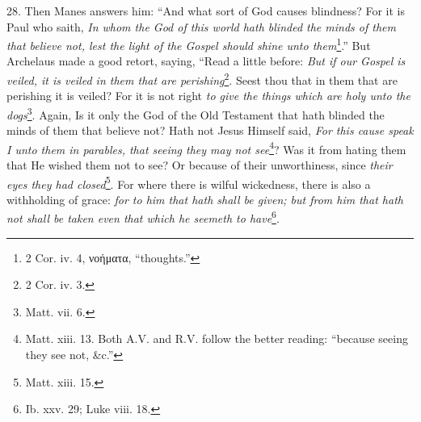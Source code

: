 28. Then Manes answers him: “And what sort of God causes blindness? For it is Paul who saith, \emph{In whom the God of this world hath blinded the minds of them that believe not, lest the light of the Gospel should shine unto them}\footnote{2 Cor. iv. 4, \textgreek{νοήματα}, “thoughts.”}.” But Archelaus made a good retort, saying, “Read a little before: \emph{But if our Gospel is veiled, it is veiled in them that are perishing}\footnote{2 Cor. iv. 3.}. Seest thou that in them that are perishing it is veiled? For it is not right \emph{to give the things which are holy unto the dogs}\footnote{Matt. vii. 6.}. Again, Is it only the God of the Old Testament that hath blinded the minds of them that believe not? Hath not Jesus Himself said, \emph{For this cause speak I unto them in parables, that seeing they may not see}\footnote{Matt. xiii. 13. Both A.V. and R.V. follow the better reading: “because seeing they see not, \&c.”}? Was it from hating them that He wished them not to see? Or because of their unworthiness, since \emph{their eyes they had closed}\footnote{Matt. xiii. 15.}. For where there is wilful wickedness, there is also a withholding of grace: \emph{for to him that hath shall be given; but from him that hath not shall be taken even that which he seemeth to have}\footnote{Ib. xxv. 29; Luke viii. 18.}.

